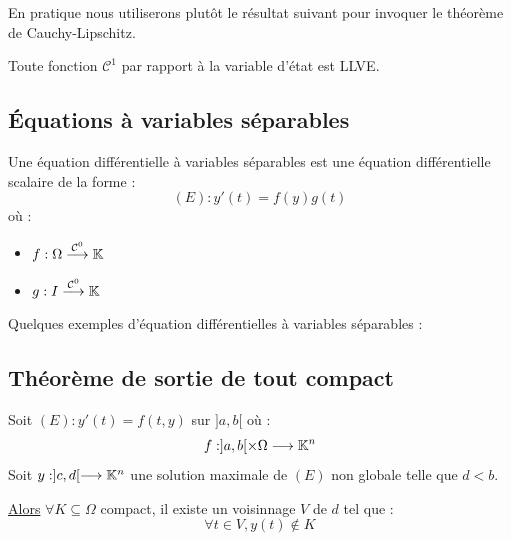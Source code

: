 En pratique nous utiliserons plutôt le résultat suivant pour invoquer le théorème de Cauchy-Lipschitz. 

\begin{proposition}
    Toute fonction $ \mathcal{C}^1$ par rapport à la variable d'état est LLVE. 
\end{proposition}


\subsection{Équations à variables séparables}

\begin{definition}
    Une équation différentielle à variables séparables est une équation différentielle scalaire de la forme : 
        \[ (E) : y'(t) = f(y)g(t) \] 
    où : 
    \begin{itemize}
        \item $f : \Omega \overset{ \mathcal{C}^0}{\longrightarrow} \mathbb{K} $
        \item $g : I \overset{ \mathcal{C}^0}{\longrightarrow} \mathbb{K} $ 
    \end{itemize}
\end{definition}

\begin{example}
    Quelques exemples d'équation différentielles à variables séparables : 

\end{example}

\subsection{Théorème de sortie de tout compact}

\begin{theorem}
    Soit $(E) : y'(t) = f(t,y)$ sur $]a,b[$ où : 
        \[ f : ]a,b[ \times \Omega \longrightarrow \mathbb{K}^n \] 
    Soit $y : ]c,d[ \longrightarrow \mathbb{K}^n$ une solution maximale de $(E)$ non globale telle que $d < b$. 

    \underline{Alors} $ \forall K \subseteq \Omega$ compact, il existe un voisinnage $V$ de $d$ tel que : 
        \[ \forall t \in V, y(t) \not \in K \] 
\end{theorem}

